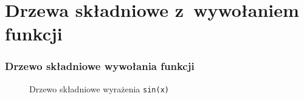\documentclass[10pt,t]{beamer}
\begin{document}










\section{Drzewa składniowe z~wywołaniem funkcji}

\label{sec:Podstawy-budowy-procesora-i-jezyka-asemblera}


\begin{frame}
  \frametitle{Drzewo składniowe wywołania funkcji}


  \begin{figure}


    \caption{Drzewo składniowe wyrażenia
      \texttt{sin(x)}}

    \label{fig:Scheme-of-CPU}

  \end{figure}






\end{frame}
\end{document}

